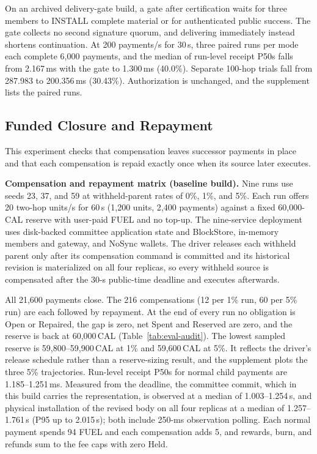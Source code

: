 On an archived delivery-gate build, a gate after certification waits for three
members to INSTALL complete material or for authenticated public success.
The gate collects no second signature quorum, and delivering immediately
instead shortens continuation. At 200
payments/s for 30\,s, three paired runs per mode each complete 6,000
payments, and the median of run-level receipt P50s falls from 2.167\,ms with
the gate to 1.300\,ms (40.0\%). Separate 100-hop trials fall from 287.983 to
200.356\,ms (30.43\%). Authorization is unchanged, and the supplement lists
the paired runs.

\subsection{Funded Closure and Repayment}
\label{sec:eval-liabilities}

This experiment checks that compensation leaves successor payments in place
and that each compensation is repaid exactly once when its source later
executes.

\noindent\textbf{Compensation and repayment matrix (baseline build).}
Nine runs use seeds 23, 37, and 59 at withheld-parent rates of 0\%, 1\%, and
5\%. Each run offers 20 two-hop units/s for 60\,s (1,200 units, 2,400
payments) against a fixed 60,000-CAL reserve with user-paid FUEL and no
top-up. The nine-service deployment uses disk-backed committee application
state and BlockStore, in-memory members and gateway, and NoSync wallets. The
driver releases each withheld parent only after its compensation command is committed
and its historical revision is materialized on all four replicas, so every withheld source is compensated
after the 30-s public-time deadline and executes afterwards.

All 21,600 payments close. The 216 compensations (12 per 1\% run, 60 per 5\%
run) are each followed by repayment. At the end of every run no obligation is
Open or Repaired, the gap is zero, net Spent and Reserved are zero, and the
reserve is back at 60,000\,CAL (Table~\ref{tab:eval-audit}). The lowest
sampled reserve is 59,800--59,900\,CAL at 1\% and 59,600\,CAL at 5\%. It
reflects the driver's release schedule rather than a reserve-sizing result,
and the supplement plots the three 5\% trajectories. Run-level receipt P50s
for normal child payments are 1.185--1.251\,ms. Measured from the deadline, the
committee commit, which in this build carries the representation, is observed
at a median of 1.003--1.254\,s, and physical installation of the revised
body on all four replicas at a median of 1.257--1.761\,s (P95 up to 2.015\,s); both include 250-ms observation
polling. Each normal payment spends 94 FUEL and each compensation adds 5, and
rewards, burn, and refunds sum to the fee caps with zero Held.

